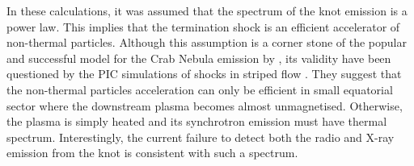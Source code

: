 In these calculations, it was assumed that the spectrum of the knot emission is a power law. This implies that the termination shock is an efficient accelerator of non-thermal particles. Although this assumption is a corner stone of the popular and successful model for the Crab Nebula emission by \citet{kc84b}, its validity have been questioned by the PIC simulations of shocks in striped flow \citep{SS-11}. They suggest that the non-thermal particles acceleration can only be efficient in small equatorial sector where the downstream plasma becomes almost unmagnetised.  Otherwise, the plasma is simply heated and its synchrotron emission must have thermal spectrum.  Interestingly, the current failure to detect both the radio and X-ray emission from the knot  is consistent with such a spectrum.      
